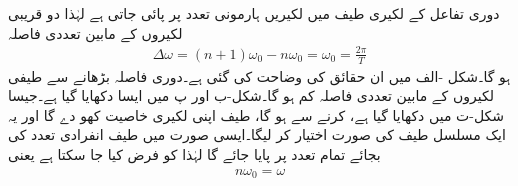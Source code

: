 دوری تفاعل کے لکیری طیف میں لکیریں ہارمونی تعدد  پر پائی جاتی ہے لہٰذا دو قریبی لکیروں کے مابین تعددی فاصلہ
\begin{align}
\Delta \omega=(n+1)\omega_0-n\omega_0 =\omega_0=\frac{2\pi}{T}
\end{align}
ہو گا۔شکل -الف میں ان حقائق کی وضاحت کی گئی ہے۔دوری فاصلہ  بڑھانے سے طیفی لکیروں کے مابین تعددی فاصلہ کم ہو گا۔شکل-ب اور پ میں ایسا دکھایا گیا ہے۔جیسا شکل-ت میں دکھایا گیا ہے،  کرنے سے  ہو گا، طیف اپنی لکیری خاصیت کھو دے گا اور یہ ایک مسلسل طیف کی صورت اختیار کر لیگا۔ایسی صورت میں طیف انفرادی تعدد  کی بجائے تمام تعدد  پر پایا جائے گا لہٰذا  کو  فرض کیا جا سکتا ہے یعنی
\begin{align}\label{مساوات_فوریئر_لامتناہی_دوری_عرصہ_تعددی_فرق}
n \omega_0 = \omega
\end{align}
%
